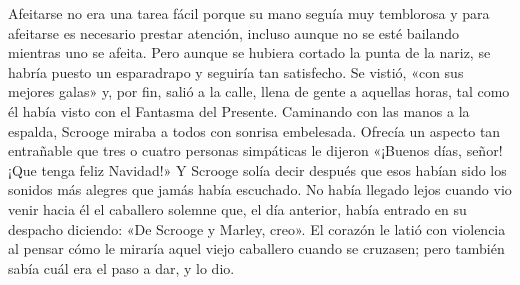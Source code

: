 \documentclass{novela}
\begin{document}
 Afeitarse no era una tarea fácil porque su mano seguía muy temblorosa y para afeitarse es necesario prestar atención, incluso aunque no se esté bailando mientras uno se afeita. Pero aunque se hubiera cortado la punta de la nariz, se habría puesto un esparadrapo y seguiría tan satisfecho.
 Se vistió, «con sus mejores galas» y, por fin, salió a la calle, llena de gente a aquellas horas, tal como él había visto con el Fantasma del Presente. Caminando con las manos a la espalda, Scrooge miraba a todos con sonrisa embelesada. Ofrecía un aspecto tan entrañable que tres o cuatro personas simpáticas le dijeron «¡Buenos días, señor! ¡Que tenga feliz Navidad!» Y Scrooge solía decir después que esos habían sido los sonidos más alegres que jamás había escuchado.
 No había llegado lejos cuando vio venir hacia él el caballero solemne que, el día anterior, había entrado en su despacho diciendo: «De Scrooge y Marley, creo». El corazón le latió con violencia al pensar cómo le miraría aquel viejo caballero cuando se cruzasen; pero también sabía cuál era el paso a dar, y lo dio.
\end{document}
